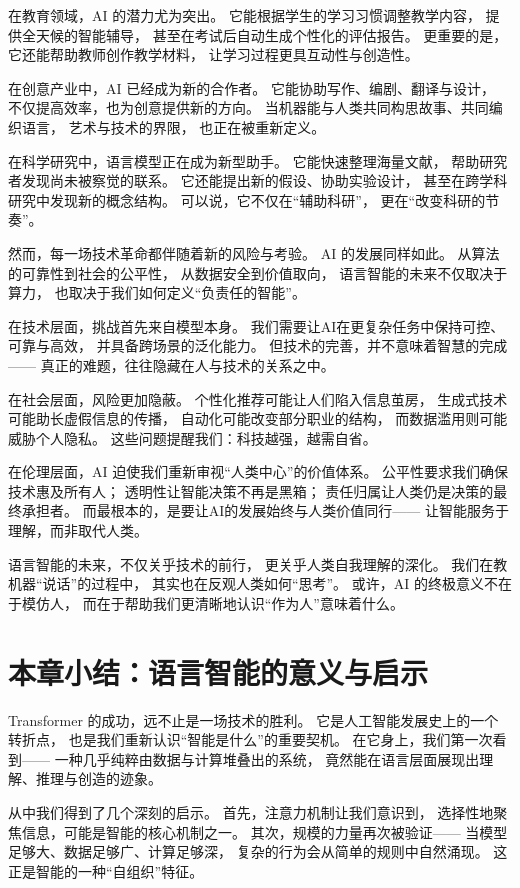 在教育领域，AI 的潜力尤为突出。  
它能根据学生的学习习惯调整教学内容，  
提供全天候的智能辅导，  
甚至在考试后自动生成个性化的评估报告。  
更重要的是，它还能帮助教师创作教学材料，  
让学习过程更具互动性与创造性。  

在创意产业中，AI 已经成为新的合作者。  
它能协助写作、编剧、翻译与设计，  
不仅提高效率，也为创意提供新的方向。  
当机器能与人类共同构思故事、共同编织语言，  
艺术与技术的界限，  
也正在被重新定义。  

在科学研究中，语言模型正在成为新型助手。  
它能快速整理海量文献，  
帮助研究者发现尚未被察觉的联系。  
它还能提出新的假设、协助实验设计，  
甚至在跨学科研究中发现新的概念结构。  
可以说，它不仅在“辅助科研”，  
更在“改变科研的节奏”。  

然而，每一场技术革命都伴随着新的风险与考验。  
AI 的发展同样如此。  
从算法的可靠性到社会的公平性，  
从数据安全到价值取向，  
语言智能的未来不仅取决于算力，  
也取决于我们如何定义“负责任的智能”。  

在技术层面，挑战首先来自模型本身。  
我们需要让AI在更复杂任务中保持可控、可靠与高效，  
并具备跨场景的泛化能力。  
但技术的完善，并不意味着智慧的完成——  
真正的难题，往往隐藏在人与技术的关系之中。  

在社会层面，风险更加隐蔽。  
个性化推荐可能让人们陷入信息茧房，  
生成式技术可能助长虚假信息的传播，  
自动化可能改变部分职业的结构，  
而数据滥用则可能威胁个人隐私。  
这些问题提醒我们：科技越强，越需自省。  

在伦理层面，AI 迫使我们重新审视“人类中心”的价值体系。  
公平性要求我们确保技术惠及所有人；  
透明性让智能决策不再是黑箱；  
责任归属让人类仍是决策的最终承担者。  
而最根本的，是要让AI的发展始终与人类价值同行——  
让智能服务于理解，而非取代人类。  

语言智能的未来，不仅关乎技术的前行，  
更关乎人类自我理解的深化。  
我们在教机器“说话”的过程中，  
其实也在反观人类如何“思考”。  
或许，AI 的终极意义不在于模仿人，  
而在于帮助我们更清晰地认识“作为人”意味着什么。  

\section{本章小结：语言智能的意义与启示}

Transformer 的成功，远不止是一场技术的胜利。  
它是人工智能发展史上的一个转折点，  
也是我们重新认识“智能是什么”的重要契机。  
在它身上，我们第一次看到——  
一种几乎纯粹由数据与计算堆叠出的系统，  
竟然能在语言层面展现出理解、推理与创造的迹象。  

从中我们得到了几个深刻的启示。  
首先，注意力机制让我们意识到，  
选择性地聚焦信息，可能是智能的核心机制之一。  
其次，规模的力量再次被验证——  
当模型足够大、数据足够广、计算足够深，  
复杂的行为会从简单的规则中自然涌现。  
这正是智能的一种“自组织”特征。  

